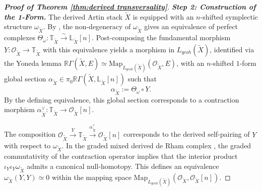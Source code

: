 \documentclass[reqno]{amsart}
\theoremstyle{definition}
\theoremstyle{remark}
\newcommand{\LL}{\mathbb{L}}
\newcommand{\TT}{\mathbb{T}}
\newcommand{\cO}{\mathcal{O}}
\begin{document}
{\begin{proof}[\textbf{Proof of Theorem \ref{thm:derived transversality}}]
  \textbf{\textit{Step 2: Construction of the 1-Form.}}
  The derived Artin stack $\widetilde{X}$ is equipped with an
  $n$-shifted symplectic structure $\omega_{\widetilde{X}}$. By \cite[Definition 1.18]{PTVV}, the
  non-degeneracy of $\omega_{\widetilde{X}}$ gives an equivalence of perfect
  complexes $\Theta_{\omega} \colon \TT_{\widetilde{X}} \xrightarrow{\sim}
  \LL_{\widetilde{X}}[n]$.
  Post-composing the fundamental morphism $Y \colon \cO_{\widetilde{X}} \to
  \TT_{\widetilde{X}}$ with this equivalence yields a morphism in $L_{qcoh}(\widetilde{X})$,
  identified via the Yoneda lemma
  $\mathbb{R}\Gamma(\widetilde{X}, E) \simeq
  \mathrm{Map}_{L_{qcoh}(\widetilde{X})}(\cO_{\widetilde{X}}, E)$,
  with an $n$-shifted $1$-form global section
  $\alpha_{\widetilde{X}} \in \pi_0 \mathbb{R}\Gamma(\widetilde{X},
  \LL_{\widetilde{X}}[n])$ \cite[Section 4.2]{Berktav1} such that
  \begin{equation*}
    \alpha_{\widetilde{X}} := \Theta_{\omega} \circ Y.
  \end{equation*}
  By the defining equivalence, this global section corresponds
  to a contraction morphism
  $\alpha_{\widetilde{X}}^\vee \colon \TT_{\widetilde{X}} \to \cO_{\widetilde{X}}[n]$.

  The composition $\cO_{\widetilde{X}} \xrightarrow{Y} \TT_{\widetilde{X}} \xrightarrow{\alpha_{\widetilde{X}}^\vee} \cO_{\widetilde{X}}[n]$ corresponds to the derived self-pairing of $Y$ with respect to $\omega_{\widetilde{X}}$. In the graded mixed derived de Rham complex \cite[Section 1.4.1]{CPTVV}, the graded commutativity of the contraction operator implies that the interior product $\iota_Y \iota_Y \omega_{\widetilde{X}}$ admits a canonical null-homotopy. This defines an equivalence $\omega_{\widetilde{X}}(Y, Y) \simeq 0$ within the mapping space $\mathrm{Map}_{L_{qcoh}(\widetilde{X})}(\cO_{\widetilde{X}}, \cO_{\widetilde{X}}[n])$.


\end{proof}}
\end{document}
